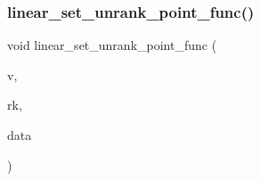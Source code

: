\mbox{\label{linear__set_8_c_a9a338c17af08272ac682ffa2aa90299b}} 
\subsubsection{\texorpdfstring{linear\+\_\+set\+\_\+unrank\+\_\+point\+\_\+func()}{linear\_set\_unrank\_point\_func()}}
{\footnotesize\ttfamily void linear\+\_\+set\+\_\+unrank\+\_\+point\+\_\+func (\begin{DoxyParamCaption}\item[{\mbox{\hyperlink{galois_8h_a09fddde158a3a20bd2dcadb609de11dc}{I\+NT}} $\ast$}]{v,  }\item[{\mbox{\hyperlink{galois_8h_a09fddde158a3a20bd2dcadb609de11dc}{I\+NT}}}]{rk,  }\item[{void $\ast$}]{data }\end{DoxyParamCaption})}

